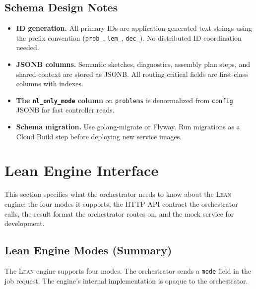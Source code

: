 \documentclass[11pt,a4paper]{article}
\newcommand{\Lean}{\textsc{Lean}}
\begin{document}
\subsection{Schema Design Notes}
\begin{itemize}[leftmargin=2em]
  \item \textbf{ID generation.} All primary IDs are application-generated text strings using the prefix convention (\texttt{prob\_}, \texttt{lem\_}, \texttt{dec\_}). No distributed ID coordination needed.
  \item \textbf{JSONB columns.} Semantic sketches, diagnostics, assembly plan steps, and shared context are stored as JSONB. All routing-critical fields are first-class columns with indexes.
  \item \textbf{The \texttt{nl\_only\_mode} column} on \texttt{problems} is denormalized from \texttt{config} JSONB for fast controller reads.
  \item \textbf{Schema migration.} Use golang-migrate or Flyway. Run migrations as a Cloud Build step before deploying new service images.
\end{itemize}

\section{Lean Engine Interface}
\label{sec:lean_interface}

This section specifies what the orchestrator needs to know about the \Lean{} engine: the four modes it supports, the HTTP API contract the orchestrator calls, the result format the orchestrator routes on, and the mock service for development.

\subsection{Lean Engine Modes (Summary)}

The \Lean{} engine supports four modes. The orchestrator sends a \texttt{mode} field in the job request. The engine's internal implementation is opaque to the orchestrator.
\end{document}
